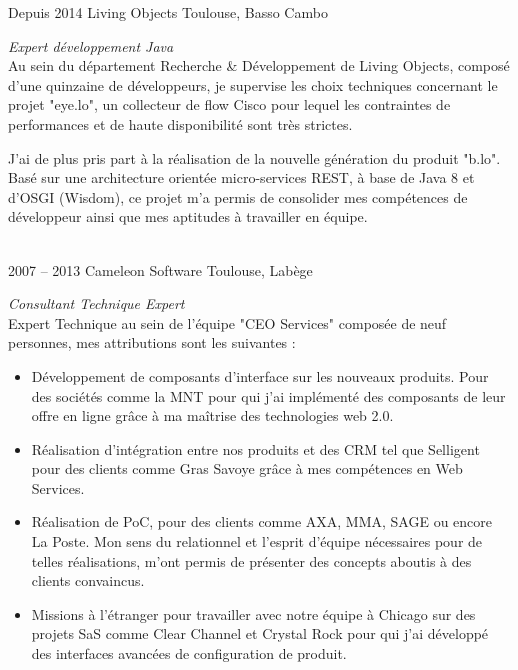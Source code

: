 \documentclass{friggeri-cv} 	%
\begin{document}
\begin{entrylist}
\entry
{Depuis 2014}
{Living Objects}
{Toulouse, Basso Cambo}
{\vspace{0.2cm}\emph{Expert développement Java} \\
Au sein du département Recherche \& Développement de Living Objects, composé d'une quinzaine de développeurs, je supervise les choix techniques concernant le projet "eye.lo", un collecteur de flow Cisco pour lequel les contraintes de performances et de haute disponibilité sont très strictes.

J'ai de plus pris part à la réalisation de la nouvelle génération du produit "b.lo". Basé sur une architecture orientée micro-services REST, à base de Java 8 et d'OSGI (Wisdom), ce projet m'a permis de consolider mes compétences de développeur ainsi que mes aptitudes à travailler en équipe.
}\\

\entry
{2007 -- 2013}
{Cameleon Software}
{Toulouse, Labège}
{\vspace{0.2cm}\emph{Consultant Technique Expert} \\
Expert Technique au sein de l'équipe "CEO Services" composée de neuf personnes, mes attributions sont les suivantes :
\begin{itemize}
\item Développement de composants d’interface sur les nouveaux produits. Pour des sociétés
comme la MNT pour qui j’ai implémenté des composants de leur offre en ligne grâce à ma
maîtrise des technologies web 2.0.
\item Réalisation d’intégration entre nos produits et des CRM tel que Selligent pour des clients
comme Gras Savoye grâce à mes compétences en Web Services.
\item Réalisation de PoC, pour des clients comme AXA, MMA, SAGE ou encore La Poste. Mon sens
du relationnel et l'esprit d'équipe nécessaires pour de telles réalisations, m'ont permis de
présenter des concepts aboutis à des clients convaincus.
\item Missions à l’étranger pour travailler avec notre équipe à Chicago sur des projets SaS comme
Clear Channel et Crystal Rock pour qui j'ai développé des interfaces avancées de
configuration de produit.
\end{itemize}
}\\


\end{entrylist}
\end{document}
